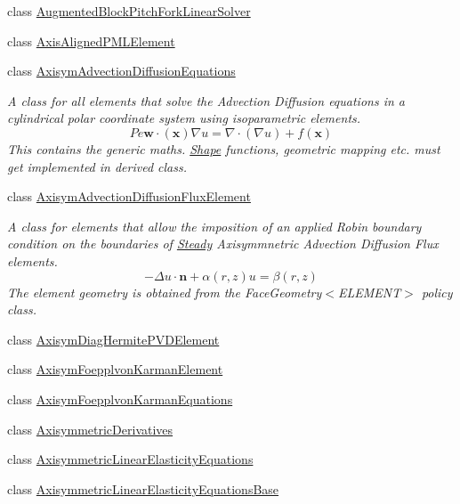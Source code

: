 \begin{DoxyCompactItemize}
\item 
class \hyperlink{classoomph_1_1AugmentedBlockPitchForkLinearSolver}{Augmented\+Block\+Pitch\+Fork\+Linear\+Solver}
\item 
class \hyperlink{classoomph_1_1AxisAlignedPMLElement}{Axis\+Aligned\+P\+M\+L\+Element}
\item 
class \hyperlink{classoomph_1_1AxisymAdvectionDiffusionEquations}{Axisym\+Advection\+Diffusion\+Equations}
\begin{DoxyCompactList}\small\item\em A class for all elements that solve the Advection Diffusion equations in a cylindrical polar coordinate system using isoparametric elements. \[ Pe \mathbf{w}\cdot(\mathbf{x}) \nabla u = \nabla \cdot \left( \nabla u \right) + f(\mathbf{x}) \] This contains the generic maths. \hyperlink{classoomph_1_1Shape}{Shape} functions, geometric mapping etc. must get implemented in derived class. \end{DoxyCompactList}\item 
class \hyperlink{classoomph_1_1AxisymAdvectionDiffusionFluxElement}{Axisym\+Advection\+Diffusion\+Flux\+Element}
\begin{DoxyCompactList}\small\item\em A class for elements that allow the imposition of an applied Robin boundary condition on the boundaries of \hyperlink{classoomph_1_1Steady}{Steady} Axisymmnetric Advection Diffusion Flux elements. \[ -\Delta u \cdot \mathbf{n} + \alpha(r,z) u = \beta(r,z) \] The element geometry is obtained from the Face\+Geometry$<$\+E\+L\+E\+M\+E\+N\+T$>$ policy class. \end{DoxyCompactList}\item 
class \hyperlink{classoomph_1_1AxisymDiagHermitePVDElement}{Axisym\+Diag\+Hermite\+P\+V\+D\+Element}
\item 
class \hyperlink{classoomph_1_1AxisymFoepplvonKarmanElement}{Axisym\+Foepplvon\+Karman\+Element}
\item 
class \hyperlink{classoomph_1_1AxisymFoepplvonKarmanEquations}{Axisym\+Foepplvon\+Karman\+Equations}
\item 
class \hyperlink{classoomph_1_1AxisymmetricDerivatives}{Axisymmetric\+Derivatives}
\item 
class \hyperlink{classoomph_1_1AxisymmetricLinearElasticityEquations}{Axisymmetric\+Linear\+Elasticity\+Equations}
\item 
class \hyperlink{classoomph_1_1AxisymmetricLinearElasticityEquationsBase}{Axisymmetric\+Linear\+Elasticity\+Equations\+Base}

\end{DoxyCompactItemize}
